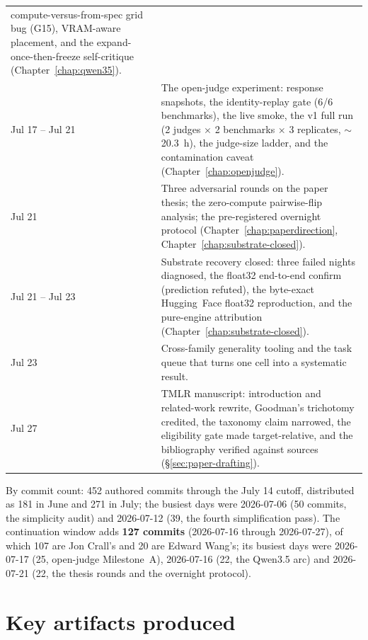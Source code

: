 \documentclass[11pt]{report}
\begin{document}
\begin{longtable}{@{}p{}p{}@{}}
    compute-versus-from-spec grid bug (G15), VRAM-aware placement, and the
    expand-once-then-freeze self-critique (Chapter~\ref{chap:qwen35}). \\
Jul 17 -- Jul 21 & The open-judge experiment: response snapshots, the
    identity-replay gate (6/6 benchmarks), the live smoke, the v1 full run
    (2 judges $\times$ 2 benchmarks $\times$ 3 replicates, $\sim$20.3~h), the
    judge-size ladder, and the contamination caveat
    (Chapter~\ref{chap:openjudge}). \\
Jul 21 & Three adversarial rounds on the paper thesis; the zero-compute
    pairwise-flip analysis; the pre-registered overnight protocol
    (Chapter~\ref{chap:paperdirection}, Chapter~\ref{chap:substrate-closed}). \\
Jul 21 -- Jul 23 & Substrate recovery closed: three failed nights diagnosed, the
    float32 end-to-end confirm (prediction refuted), the byte-exact Hugging~Face
    float32 reproduction, and the pure-engine attribution
    (Chapter~\ref{chap:substrate-closed}). \\
Jul 23 & Cross-family generality tooling and the task queue that turns one cell into
    a systematic result. \\
Jul 27 & TMLR manuscript: introduction and related-work rewrite, Goodman's
    trichotomy credited, the taxonomy claim narrowed, the eligibility gate made
    target-relative, and the bibliography verified against sources
    (\S\ref{sec:paper-drafting}). \\
\bottomrule
\end{longtable}

By commit count: 452 authored commits through the July 14 cutoff, distributed as 181
in June and 271 in July; the busiest days were 2026-07-06 (50 commits, the simplicity
audit) and 2026-07-12 (39, the fourth simplification pass). The continuation window
adds \textbf{127 commits} (2026-07-16 through 2026-07-27), of which 107 are Jon
Crall's and 20 are Edward Wang's; its busiest days were 2026-07-17 (25, open-judge
Milestone~A), 2026-07-16 (22, the Qwen3.5 arc) and 2026-07-21 (22, the thesis rounds
and the overnight protocol).

\section{Key artifacts produced}
\end{document}
